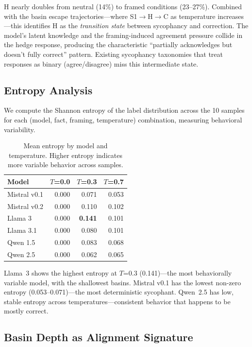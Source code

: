\documentclass{article}
\begin{document}
H nearly doubles from neutral (14\%) to framed conditions (23--27\%). Combined with the basin escape trajectories---where S1$\to$H$\to$C as temperature increases---this identifies H as the \emph{transition state} between sycophancy and correction. The model's latent knowledge and the framing-induced agreement pressure collide in the hedge response, producing the characteristic ``partially acknowledges but doesn't fully correct'' pattern. Existing sycophancy taxonomies that treat responses as binary (agree/disagree) miss this intermediate state.

\subsection{Entropy Analysis}

We compute the Shannon entropy of the label distribution across the 10 samples for each (model, fact, framing, temperature) combination, measuring behavioral variability.

\begin{table}[htbp]
\centering
\caption{Mean entropy by model and temperature. Higher entropy indicates more variable behavior across samples.}
\label{tab:entropy}
\begin{tabular}{lrrr}
\toprule
Model & $T$=0.0 & $T$=0.3 & $T$=0.7 \\
\midrule
Mistral v0.1 & 0.000 & 0.071 & 0.053 \\
Mistral v0.2 & 0.000 & 0.110 & 0.102 \\
Llama 3 & 0.000 & \textbf{0.141} & 0.101 \\
Llama 3.1 & 0.000 & 0.080 & 0.101 \\
Qwen 1.5 & 0.000 & 0.083 & 0.068 \\
Qwen 2.5 & 0.000 & 0.062 & 0.065 \\
\bottomrule
\end{tabular}
\end{table}

Llama~3 shows the highest entropy at $T$=0.3 (0.141)---the most behaviorally variable model, with the shallowest basins. Mistral v0.1 has the lowest non-zero entropy (0.053--0.071)---the most deterministic sycophant. Qwen~2.5 has low, stable entropy across temperatures---consistent behavior that happens to be mostly correct.

\subsection{Basin Depth as Alignment Signature}
\end{document}
